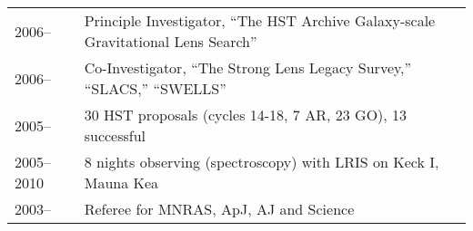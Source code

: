 \begin{tabular}{@{}p{2.5cm}p{15.5cm}}
2006--      & Principle Investigator, ``The HST Archive Galaxy-scale Gravitational Lens Search''  \\
2006--      & Co-Investigator, ``The Strong Lens Legacy Survey,'' ``SLACS,'' ``SWELLS''  \\
2005--      & 30 HST proposals (cycles 14-18, 7 AR, 23 GO), 13 successful \\
2005--2010  & 8 nights observing (spectroscopy) with LRIS on Keck I, Mauna Kea\\
2003--      & Referee for MNRAS, ApJ, AJ and Science\\
\end{tabular}
